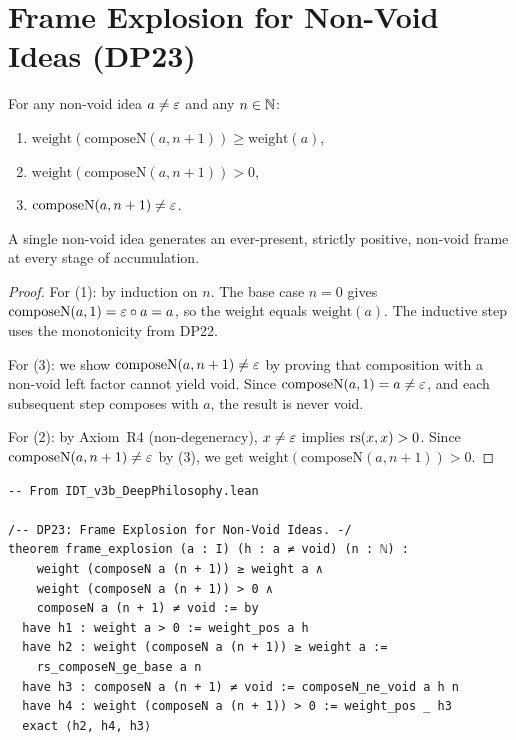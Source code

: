 \section{Frame Explosion for Non-Void Ideas (DP23)}

\begin{theorem}
\label{thm:frame-explosion}
For any non-void idea $a \neq \varepsilon$ and any $n \in \mathbb{N}$:
\begin{enumerate}
\item $\mathrm{weight}(\mathrm{composeN}(a, n+1)) \geq \mathrm{weight}(a)$,
\item $\mathrm{weight}(\mathrm{composeN}(a, n+1)) > 0$,
\item $\mathrm{composeN}(a, n+1) \neq \varepsilon$.
\end{enumerate}
A single non-void idea generates an ever-present, strictly positive,
non-void frame at every stage of accumulation.
\end{theorem}

\begin{proof}
For (1): by induction on $n$.  The base case $n = 0$ gives
$\mathrm{composeN}(a, 1) = \varepsilon \circ a = a$, so the weight
equals $\mathrm{weight}(a)$.  The inductive step uses the monotonicity
from DP22.

For (3): we show $\mathrm{composeN}(a, n+1) \neq \varepsilon$ by proving that
composition with a non-void left factor cannot yield void.  Since
$\mathrm{composeN}(a, 1) = a \neq \varepsilon$, and each subsequent step
composes with $a$, the result is never void.

For (2): by Axiom~R4 (non-degeneracy), $x \neq \varepsilon$ implies
$\mathrm{rs}(x,x) > 0$.  Since $\mathrm{composeN}(a,n+1) \neq \varepsilon$ by (3),
we get $\mathrm{weight}(\mathrm{composeN}(a,n+1)) > 0$.
\end{proof}

\begin{lstlisting}
-- From IDT_v3b_DeepPhilosophy.lean

/-- DP23: Frame Explosion for Non-Void Ideas. -/
theorem frame_explosion (a : I) (h : a ≠ void) (n : ℕ) :
    weight (composeN a (n + 1)) ≥ weight a ∧
    weight (composeN a (n + 1)) > 0 ∧
    composeN a (n + 1) ≠ void := by
  have h1 : weight a > 0 := weight_pos a h
  have h2 : weight (composeN a (n + 1)) ≥ weight a :=
    rs_composeN_ge_base a n
  have h3 : composeN a (n + 1) ≠ void := composeN_ne_void a h n
  have h4 : weight (composeN a (n + 1)) > 0 := weight_pos _ h3
  exact ⟨h2, h4, h3⟩
\end{lstlisting}

